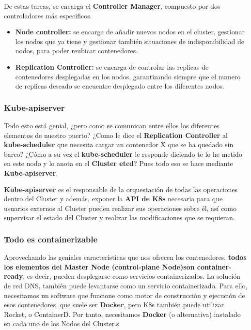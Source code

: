 \documentclass{article}
\begin{document}
De estas tareas, se encarga el \textbf{Controller Manager}, compuesto por dos controladores más especificos.

\begin{itemize}
    \item \textbf{Node controller:} se encarga de añadir nuevos nodos en el cluster, gestionar los nodos que ya tiene y gestionar también situaciones de indisponibilidad de nodos, para poder reubicar contenedores.
    
    \item \textbf{Replication Controller:} se encarga de controlar las replicas de contenedores desplegadas en los nodos, garantizando siempre que el numero de replicas deseado se encuentre desplegado entre los diferentes nodos.
\end{itemize}

\subsubsection{Kube-apiserver}

Todo esto está genial, ¿pero como se comunican entre ellos los diferentes elementos de nuestro puerto? ¿Como le dice el \textbf{Replication Controller} al \textbf{kube-scheduler} que necesita cargar un contenedor X que se ha quedado sin barco? ¿Cómo a su vez el \textbf{kube-scheduler} le responde diciendo te lo he metido en este nodo y lo anota en el \textbf{Cluster etcd}? Pues todo eso se hace mediante \textbf{Kube-apiserver}.

\textbf{Kube-apiserver} es el responsable de la orquestación de todas las operaciones dentro del Cluster y además, exponer la \textbf{API de K8s} necesaria para que usuarios externos al Cluster pueden realizar sus operaciones sobre él, así como supervisar el estado del Cluster y realizar las modificaciones que se requieran.

\subsubsection{Todo es containerizable}

Aprovechando las geniales características que nos ofrecen los contenedores, \textbf{todos los elementos del Master Node (control-plane Node)son container-ready}, es decir, pueden desplegarse como servicios containerizados. La solución de red DNS, también puede levantarse como un servicio containerizado. Para ello, necesitamos un software que funcione como motor de construcción y ejecución de esos contenedores, que suele ser \textbf{Docker}, pero K8s también puede utilizar Rocket, o ContainerD. Por tanto, necesitamos \textbf{Docker} (o alternativa) instalado en cada uno de los Nodos del Cluster.s
\end{document}
